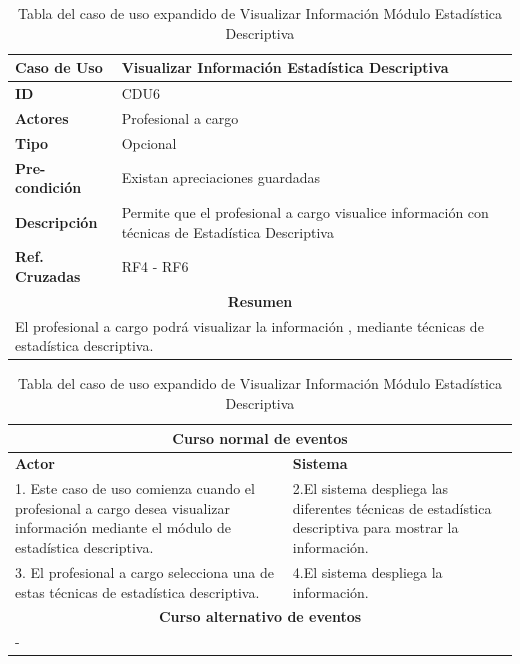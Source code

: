 \newpage
\clearpage


\newpage
\clearpage

\begin{table}
	\centering
	\begin{tabular}{|p{6cm} |p{6cm}|}
		\hline \textbf{Caso de Uso} & Visualizar Información Estadística Descriptiva \\ 
		\hline \textbf{ID} & CDU6 \\ 
		\hline \textbf{Actores} & Profesional a cargo \\ 
		\hline \textbf{Tipo} & Opcional \\ 
		\hline \textbf{Pre-condición} & Existan apreciaciones guardadas \\ 
		\hline \textbf{Descripción} & Permite que el profesional a cargo visualice información con técnicas de Estadística Descriptiva \\
		\hline \textbf{Ref. Cruzadas} & RF4 - RF6 \\ 
		\hline
		\multicolumn{2}{|c|}{\textbf{Resumen}} \\
		\hline
		\multicolumn{2}{|p{12cm}|}{El profesional a cargo podrá visualizar la información , mediante técnicas de estadística descriptiva.} \\
		\hline 
	\end{tabular}  
	\begin{tabular}{|p{6cm}|p{6cm}|}
		\multicolumn{2}{|c|}{\textbf{Curso normal de eventos}} \\
		\hline \textbf{Actor} & \textbf{Sistema} \\ 
		\hline 1. Este caso de uso comienza cuando el profesional a cargo desea visualizar información mediante el módulo de estadística descriptiva. & 2.El sistema despliega las diferentes técnicas de estadística descriptiva para mostrar la información.  \\ 
		3. El profesional a cargo selecciona una de estas técnicas de estadística descriptiva. & 4.El sistema despliega la información.  \\ 
		\hline
		\multicolumn{2}{|c|}{\textbf{Curso alternativo de eventos}} \\
		\hline
		\multicolumn{2}{|p{12cm}|}{ - } \\
		\hline
	\end{tabular}
	\caption{Tabla del caso de uso expandido de Visualizar Información Módulo Estadística Descriptiva}
	\label{tabcdu6}
\end{table}


